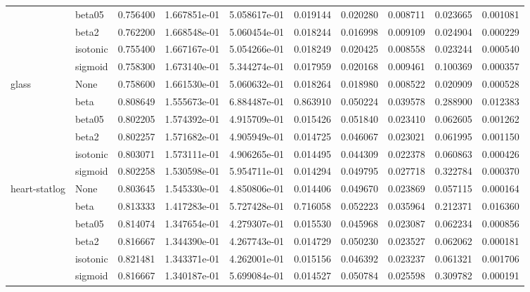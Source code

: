 \begin{tabular}{llrrrrrrrr}
        & beta05 &  0.756400 &  1.667851e-01 &  5.058617e-01 &   0.019144 &  0.020280 &  0.008711 &  0.023665 &  0.001081 \\
        & beta2 &  0.762200 &  1.668548e-01 &  5.060454e-01 &   0.018244 &  0.016998 &  0.009109 &  0.024904 &  0.000229 \\
        & isotonic &  0.755400 &  1.667167e-01 &  5.054266e-01 &   0.018249 &  0.020425 &  0.008558 &  0.023244 &  0.000540 \\
        & sigmoid &  0.758300 &  1.673140e-01 &  5.344274e-01 &   0.017959 &  0.020168 &  0.009461 &  0.100369 &  0.000357 \\
glass & None &  0.758600 &  1.661530e-01 &  5.060632e-01 &   0.018264 &  0.018980 &  0.008522 &  0.020909 &  0.000528 \\
        & beta &  0.808649 &  1.555673e-01 &  6.884487e-01 &   0.863910 &  0.050224 &  0.039578 &  0.288900 &  0.012383 \\
        & beta05 &  0.802205 &  1.574392e-01 &  4.915709e-01 &   0.015426 &  0.051840 &  0.023410 &  0.062605 &  0.001262 \\
        & beta2 &  0.802257 &  1.571682e-01 &  4.905949e-01 &   0.014725 &  0.046067 &  0.023021 &  0.061995 &  0.001150 \\
        & isotonic &  0.803071 &  1.573111e-01 &  4.906265e-01 &   0.014495 &  0.044309 &  0.022378 &  0.060863 &  0.000426 \\
        & sigmoid &  0.802258 &  1.530598e-01 &  5.954711e-01 &   0.014294 &  0.049795 &  0.027718 &  0.322784 &  0.000370 \\
heart-statlog & None &  0.803645 &  1.545330e-01 &  4.850806e-01 &   0.014406 &  0.049670 &  0.023869 &  0.057115 &  0.000164 \\
        & beta &  0.813333 &  1.417283e-01 &  5.727428e-01 &   0.716058 &  0.052223 &  0.035964 &  0.212371 &  0.016360 \\
        & beta05 &  0.814074 &  1.347654e-01 &  4.279307e-01 &   0.015530 &  0.045968 &  0.023087 &  0.062234 &  0.000856 \\
        & beta2 &  0.816667 &  1.344390e-01 &  4.267743e-01 &   0.014729 &  0.050230 &  0.023527 &  0.062062 &  0.000181 \\
        & isotonic &  0.821481 &  1.343371e-01 &  4.262001e-01 &   0.015156 &  0.046392 &  0.023237 &  0.061321 &  0.001706 \\
        & sigmoid &  0.816667 &  1.340187e-01 &  5.699084e-01 &   0.014527 &  0.050784 &  0.025598 &  0.309782 &  0.000191 \\

\end{tabular}
